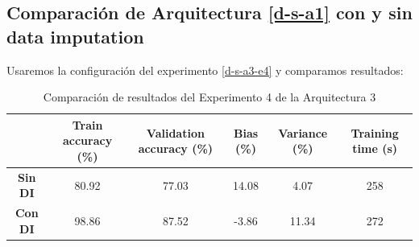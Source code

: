 \documentclass{article}
\begin{document}
			\subsection{Comparaci\'on de Arquitectura \ref{d-s-a1} con y sin data imputation}
		\label{d-s-dp-2}
			Usaremos la configuraci\'on del experimento \ref{d-s-a3-e4} y comparamos resultados:
			\begin{table}[!h]
				\begin{center}
					\begin{tabular}{ c | c | c | c | c | c |}
						\ & \textbf{Train accuracy (\%)} & \textbf{Validation accuracy (\%)} & \textbf{Bias (\%)} & \textbf{Variance (\%)} & \textbf{Training time (s)} \\ \hline
						\textbf{Sin DI} & 80.92 & 77.03 & 14.08 & 4.07 & 258\\ \hline
						\textbf{Con DI} & 98.86 & 87.52 & -3.86 & 11.34 & 272 \\ \hline
					\end{tabular}
					\caption{Comparaci\'on de resultados del Experimento 4 de la Arquitectura 3}
					\label{tab:res-d-a1-e2}
				\end{center}
			\end{table}
\end{document}
